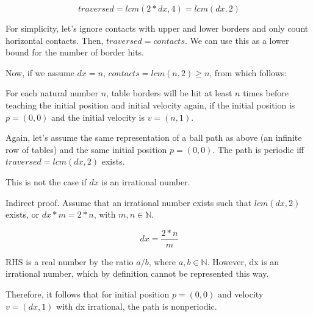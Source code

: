 \documentclass[12pt,a4paper,titlepage,oneside]{article}
\begin{document}
\begin{displaymath}
    \mathit{traversed} = lcm(2 * dx, 4) = lcm(dx, 2)
\end{displaymath}

For simplicity, let's ignore contacts with upper and lower borders and only
count horizontal contacts.  Then, $\mathit{traversed} = \mathit{contacts}$. We
can use this as a lower bound for the number of border hits.

Now, if we assume $dx = n$, $\mathit{contacts} = lcm(n, 2) \geq n$, from which
follows:

For each natural number $n$, table borders will be hit at least $n$ times
before teaching the initial position and initial velocity again, if the initial
position is $p = (0, 0)$ and the initial velocity is $v = (n, 1)$.



Again, let's assume the same representation of a ball path as above (an
infinite row of tables) and the same initial position $p = (0, 0)$.
The path is periodic iff $\mathit{traversed} = lcm(dx, 2)$ exists.

This is not the case if $dx$ is an irrational number.

Indirect proof. Assume that an irrational number exists such that $lcm(dx, 2)$
exists, or $dx * m = 2 * n$, with $m, n \in \mathbb{N}$.

\begin{displaymath}
    dx = \frac{2 * n}{m}
\end{displaymath}

RHS is a real number by the ratio $a/b$, where $a, b \in \mathbb{N}$. However,
dx is an irrational number, which by definition cannot be represented this way.

Therefore, it follows that for initial position $p = (0, 0)$ and velocity
$v = (dx, 1)$ with dx irrational, the path is nonperiodic.


\newpage
\appendix
\end{document}
